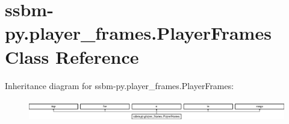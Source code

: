 \hypertarget{classssbm-py_1_1player__frames_1_1_player_frames}{}\section{ssbm-\/py.player\+\_\+frames.\+Player\+Frames Class Reference}
\label{classssbm-py_1_1player__frames_1_1_player_frames}
Inheritance diagram for ssbm-\/py.player\+\_\+frames.\+Player\+Frames\+:\begin{figure}[H]
\begin{center}
\leavevmode
\includegraphics[height=0.945148cm]{classssbm-py_1_1player__frames_1_1_player_frames}
\end{center}
\end{figure}
